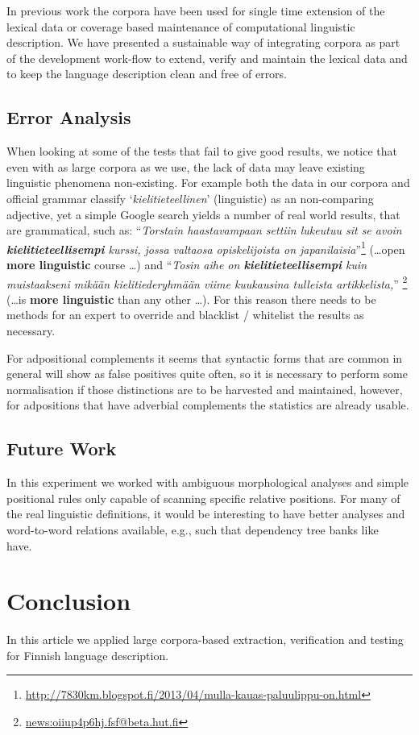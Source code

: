 \documentclass[a5paper]{article}
\begin{document}
In previous work the corpora have been used for single time extension of the
lexical data or coverage based maintenance of computational linguistic
description. We have presented a sustainable way of integrating corpora as part
of the development work-flow to extend, verify and maintain the lexical data
and to keep the language description clean and free of errors.

\subsection{Error Analysis}

When looking at some of the tests that fail to give good results, we notice
that even with as large corpora as we use, the lack of data may leave existing
linguistic phenomena non-existing. For example both the data in our corpora and
official grammar classify `\emph{kielitieteellinen}' (linguistic) as an
non-comparing adjective, yet a simple Google search yields a number of real
world results, that are grammatical, such as: ``\emph{Torstain haastavampaan
    settiin lukeutuu sit se avoin \textbf{kielitieteellisempi} kurssi, jossa
valtaosa opiskelijoista on
japanilaisia}''\footnote{\url{http://7830km.blogspot.fi/2013/04/mulla-kauas-paluulippu-on.html}}
(\ldots open \textbf{more linguistic} course \ldots) and ``\emph{Tosin aihe on
\textbf{kielitieteellisempi} kuin muistaakseni mikään kielitiederyhmään viime
kuukausina tulleista artikkelista,}''
\footnote{\url{news:oiiup4p6hj.fsf@beta.hut.fi}} (\ldots is \textbf{more
linguistic} than any other \ldots). For this reason there needs to be methods
for an expert to override and blacklist / whitelist the results as necessary.

For adpositional complements it seems that syntactic forms that are common
in general will show as false positives quite often, so it is necessary to
perform some normalisation if those distinctions are to be harvested and
maintained, however, for adpositions that have adverbial complements the
statistics are already usable.

\subsection{Future Work}

In this experiment we worked with ambiguous morphological analyses and simple
positional rules only capable of scanning specific relative
positions. For many of the real linguistic definitions, it would be interesting
to have better analyses and word-to-word relations available, e.g., such that
dependency tree banks like~\cite{haverinen2013building} have.

\section{Conclusion}

In this article we applied large corpora-based extraction, verification and
testing for Finnish language description.



\end{document}

